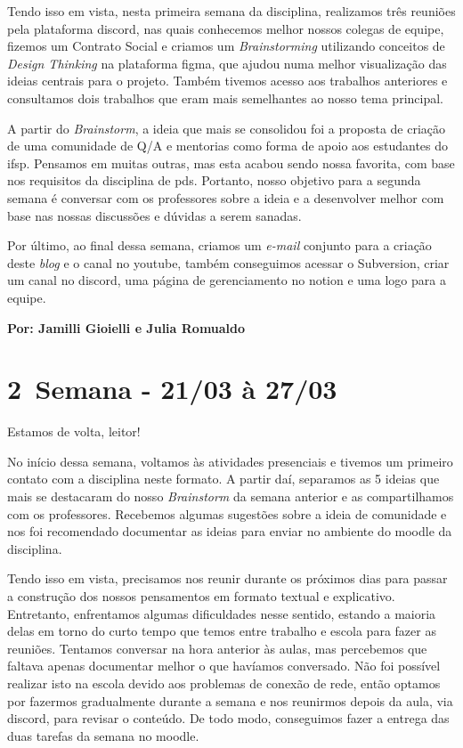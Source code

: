 Tendo isso em vista, nesta primeira semana da disciplina, realizamos três reuniões pela plataforma \gls{discord}, nas quais conhecemos melhor nossos colegas de equipe, fizemos um Contrato Social e criamos um \textsl{Brainstorming} utilizando conceitos de \textsl{Design Thinking} na plataforma \gls{figma}, que ajudou numa melhor visualização das ideias centrais para o projeto.  Também tivemos acesso aos trabalhos anteriores e consultamos dois trabalhos que eram mais semelhantes ao nosso tema principal. 

A partir do \textsl{Brainstorm}, a ideia que mais se consolidou foi a proposta de criação de uma comunidade de \acs{Q/A} e mentorias como forma de apoio aos estudantes do \acs{ifsp}. Pensamos em muitas outras, mas esta acabou sendo nossa favorita, com base nos requisitos da disciplina de \acs{pds}. Portanto, nosso objetivo para a segunda semana é conversar com os professores sobre a ideia e a desenvolver melhor com base nas nossas discussões e dúvidas a serem sanadas.

Por último, ao final dessa semana, criamos um \textsl{e-mail} conjunto para a criação deste \textsl{blog} e o canal no \gls{youtube}, também conseguimos acessar o Subversion, criar um canal no \gls{discord}, uma página de gerenciamento no \gls{notion} e uma logo para a equipe.


 \textbf{Por: Jamilli Gioielli e Julia Romualdo}

\section{2\textordfeminine \, Semana - 21/03 à 27/03}

Estamos de volta, leitor!

No início dessa semana, voltamos às atividades presenciais e tivemos um primeiro contato com a disciplina neste formato. A partir daí, separamos as 5 ideias que mais se destacaram do nosso \textsl{Brainstorm} da semana anterior e as compartilhamos com os professores. Recebemos algumas sugestões sobre a ideia de comunidade e nos foi recomendado documentar as ideias para enviar no ambiente do \gls{moodle} da disciplina. 

Tendo isso em vista, precisamos nos reunir durante os próximos dias para passar a construção dos nossos pensamentos em formato textual e explicativo. Entretanto, enfrentamos algumas dificuldades nesse sentido, estando a maioria delas em torno do curto tempo que temos entre trabalho e escola para fazer as reuniões. Tentamos conversar na hora anterior às aulas, mas percebemos que faltava apenas documentar melhor o que havíamos conversado. Não foi possível realizar isto na escola devido aos problemas de conexão de rede, então optamos por fazermos gradualmente durante a semana e nos reunirmos depois da aula, via \gls{discord}, para revisar o conteúdo. De todo modo, conseguimos fazer a entrega das duas tarefas da semana no \gls{moodle}.

